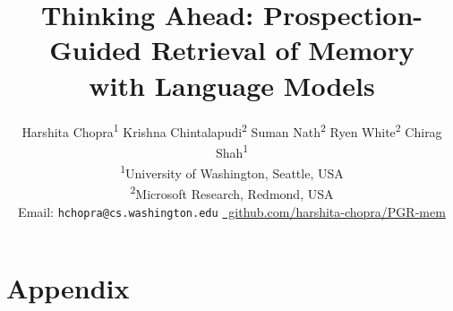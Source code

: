 \documentclass{article}
\title{Thinking Ahead: Prospection-Guided Retrieval of Memory \\ with Language Models}
\author{
  Harshita Chopra\textsuperscript{1} \quad
  Krishna Chintalapudi\textsuperscript{2} \quad
  Suman Nath\textsuperscript{2} \quad
  Ryen White\textsuperscript{2} \quad
  Chirag Shah\textsuperscript{1} \\ [10pt]
  \textsuperscript{1}University of Washington, Seattle, USA \\
  \textsuperscript{2}Microsoft Research, Redmond, USA \\ [10pt]
  \small Email: \texttt{hchopra@cs.washington.edu} \quad \quad \href{https://github.com/harshita-chopra/PGR-mem}{\faGithub\ github.com/harshita-chopra/PGR-mem}
}
\begin{document}
\maketitle









  
  

\newpage
\appendix
\section{Appendix}
\label{sec:appendix}

\end{document}
